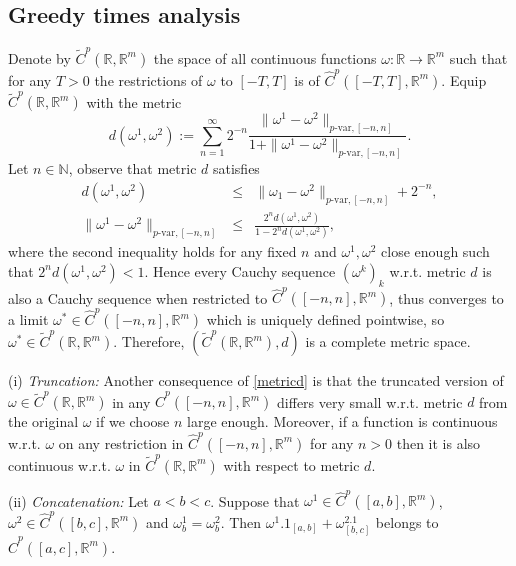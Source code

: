 \documentclass[10pt]{article}
\numberwithin{equation}{section} %
\newcommand{\R}{\ensuremath{\mathbb{R}}}
\newcommand{\N}{\ensuremath{\mathbb{N}}}
\begin{document}
\subsection{Greedy times analysis}\label{subsec.greedy-times}
Denote by $\widetilde{C}^{p}(\R,\R^m)$ the space of all continuous functions $\omega: \R \to \R^m$ such that for any $T>0$ the restrictions of $\omega$ to $[-T,T]$ is of $\widehat{C}^{p}([-T,T],\R^m)$. Equip $\widetilde{C}^{p}(\R,\R^m)$ with the metric
\[
d(\omega^1,\omega^2) := \sum_{n=1}^\infty 2^{-n} \frac{\|\omega^1 - \omega^2\|_{p\text{-var},[-n,n]}}{1+\|\omega^1 - \omega^2\|_{p\text{-var},[-n,n]}}.
\]
Let $n\in \N$, observe that metric $d$ satisfies
 \begin{equation}\label{metricd}
 \begin{array}{rcl}
d(\omega^1,\omega^2) &\leq& \|\omega_1 - \omega^2\|_{p\text{-var},[-n,n]} + 2^{-n},\\[6pt] 
 \|\omega^1 -\omega^2\|_{p\text{-var},[-n,n]} &\leq& \frac{2^n d(\omega^1,\omega^2)}{1- 2^n d(\omega^1,\omega^2)},
 \end{array}
\end{equation}
where the second inequality holds for any fixed $n$ and $\omega^1, \omega^2$ close enough such that $2^n d(\omega^1,\omega^2) <1$. Hence every Cauchy sequence $(\omega^k)_k$ w.r.t. metric $d$ is also a Cauchy sequence when restricted to $\widehat{C}^p([-n,n],\R^m)$, thus converges to a limit $\omega^*\in \widehat{C}^p([-n,n],\R^m)$ which is uniquely defined pointwise, so $\omega^* \in \widetilde{C}^{p}(\R,\R^m)$. Therefore, $(\widetilde{C}^{p}(\R,\R^m),d)$ is a complete metric space.%
\begin{remark}\label{truncated}
(i) {\em Truncation:} Another consequence of \eqref{metricd} is that the truncated version of $\omega \in \widetilde{C}^{p}(\R,\R^m)$ in any $\widehat{C}^p([-n,n],\R^m)$ differs very small w.r.t. metric $d$ from the original $\omega$ if we choose $n$ large enough. Moreover, if a function is continuous w.r.t. $\omega$ on any restriction in $\widehat{C}^p([-n,n],\R^m)$ for any $n >0$ then it is also continuous w.r.t. $\omega$ in $\widetilde{C}^{p}(\R,\R^m)$ with respect to metric $d$. 

(ii) {\em Concatenation:} Let $a<b<c$. Suppose that
$ \omega^1 \in \widehat{C}^{p}([a,b],\R^m)$, $\omega^2 \in \widehat{C}^{p}([b,c],\R^m)$ and 
$\omega^1_b=\omega^2_b$. Then $\omega^1. 1_{[a,b]} +\omega^2.1_{[b,c]}$ belongs to $\widehat{C}^{p}([a,c],\R^m)$. 
\end{remark}
\end{document}
